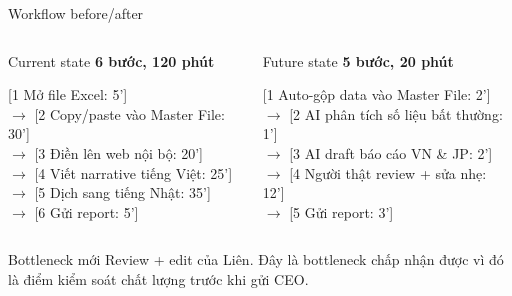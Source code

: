\documentclass[aspectratio=169,11pt]{beamer}
\begin{document}
\begin{frame}{Workflow before/after}
  \begin{columns}[T,onlytextwidth]
    \begin{block}{Current state}
      \small
      \textbf{6 bước, 120 phút}

      \vspace{0.2cm}
      [1 Mở file Excel: 5']\\
      $\rightarrow$ [2 Copy/paste vào Master File: 30']\\
      $\rightarrow$ [3 Điền lên web nội bộ: 20']\\
      $\rightarrow$ [4 Viết narrative tiếng Việt: 25']\\
      $\rightarrow$ [5 Dịch sang tiếng Nhật: 35']\\
      $\rightarrow$ [6 Gửi report: 5']
    \end{block}

    \begin{block}{Future state}
      \small
      \textbf{5 bước, 20 phút}

      \vspace{0.2cm}
      [1 Auto-gộp data vào Master File: 2']\\
      $\rightarrow$ [2 AI phân tích số liệu bất thường: 1']\\
      $\rightarrow$ [3 AI draft báo cáo VN \& JP: 2']\\
      $\rightarrow$ [4 Người thật review + sửa nhẹ: 12']\\
      $\rightarrow$ [5 Gửi report: 3']
    \end{block}
  \end{columns}

  \vspace{0.15cm}
  \begin{block}{Bottleneck mới}
    Review + edit của Liên. Đây là bottleneck chấp nhận được vì đó là điểm kiểm soát chất lượng trước khi gửi CEO.
  \end{block}
\end{frame}
\end{document}

